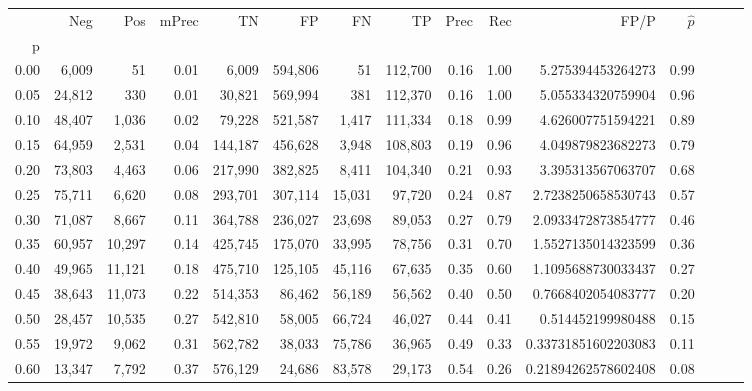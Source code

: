 \begin{tabular}{rrrrrrrrrrrrrrr}
\toprule
{} &     Neg &     Pos & mPrec &       TN &       FP &       FN &       TP &  Prec &   Rec &                  FP/P & $\hat{p}$ \\
p    &         &         &       &          &          &          &          &       &       &                       &           \\
\midrule
0.00 &   6,009 &      51 &  0.01 &    6,009 &  594,806 &       51 &  112,700 &  0.16 &  1.00 &     5.275394453264273 &      0.99 \\
0.05 &  24,812 &     330 &  0.01 &   30,821 &  569,994 &      381 &  112,370 &  0.16 &  1.00 &     5.055334320759904 &      0.96 \\
0.10 &  48,407 &   1,036 &  0.02 &   79,228 &  521,587 &    1,417 &  111,334 &  0.18 &  0.99 &     4.626007751594221 &      0.89 \\
0.15 &  64,959 &   2,531 &  0.04 &  144,187 &  456,628 &    3,948 &  108,803 &  0.19 &  0.96 &     4.049879823682273 &      0.79 \\
0.20 &  73,803 &   4,463 &  0.06 &  217,990 &  382,825 &    8,411 &  104,340 &  0.21 &  0.93 &     3.395313567063707 &      0.68 \\
0.25 &  75,711 &   6,620 &  0.08 &  293,701 &  307,114 &   15,031 &   97,720 &  0.24 &  0.87 &    2.7238250658530743 &      0.57 \\
0.30 &  71,087 &   8,667 &  0.11 &  364,788 &  236,027 &   23,698 &   89,053 &  0.27 &  0.79 &    2.0933472873854777 &      0.46 \\
0.35 &  60,957 &  10,297 &  0.14 &  425,745 &  175,070 &   33,995 &   78,756 &  0.31 &  0.70 &    1.5527135014323599 &      0.36 \\
0.40 &  49,965 &  11,121 &  0.18 &  475,710 &  125,105 &   45,116 &   67,635 &  0.35 &  0.60 &    1.1095688730033437 &      0.27 \\
0.45 &  38,643 &  11,073 &  0.22 &  514,353 &   86,462 &   56,189 &   56,562 &  0.40 &  0.50 &    0.7668402054083777 &      0.20 \\
0.50 &  28,457 &  10,535 &  0.27 &  542,810 &   58,005 &   66,724 &   46,027 &  0.44 &  0.41 &     0.514452199980488 &      0.15 \\
0.55 &  19,972 &   9,062 &  0.31 &  562,782 &   38,033 &   75,786 &   36,965 &  0.49 &  0.33 &   0.33731851602203083 &      0.11 \\
0.60 &  13,347 &   7,792 &  0.37 &  576,129 &   24,686 &   83,578 &   29,173 &  0.54 &  0.26 &   0.21894262578602408 &      0.08 \\

\end{tabular}
